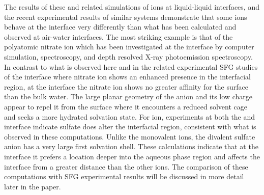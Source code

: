 The results of these and related simulations of ions at liquid-liquid interfaces, and the recent experimental results of similar systems demonstrate that some ions behave at the \ctcwat interface very differently than what has been calculated and observed at air-water interfaces.\cite{Wick2006,Wick2007a,Jungwirth2006a} The most striking example is that of the polyatomic nitrate ion which has been investigated at the \airwat interface by computer simulation,\cite{Miller2009,Thomas2007} spectroscopy,\cite{Otten2007,Schnitzer2000,Xu2009} and depth resolved X-ray photoemission spectroscopy.\cite{Brown2009} In contrast to what is observed here and in the related experimental SFG studies of the \ctcwat interface where nitrate ion shows an enhanced presence in the interfacial region, at the \airwat interface the nitrate ion shows no greater affinity for the surface than the bulk water. The large planar geometry of the \nit anion and its low charge appear to repel it from the \airwat surface where it encounters a reduced solvent cage and seeks a more hydrated solvation state. For \sul ion, experiments at both the \airwat\cite{Gopalakrishnan2005} and \ctcwat interface indicate sulfate does alter the interfacial region, consistent with what is observed in these computations. Unlike the monovalent ions, the divalent sulfate anion has a very large first solvation shell. These calculations indicate that at the \ctcwat interface it prefers a location deeper into the aqueous phase region and affects the interface from a greater distance than the other ions. The comparison of these computations with SFG experimental results will be discussed in more detail later in the paper.


